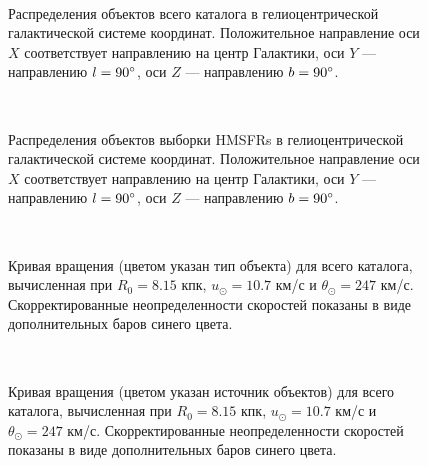 \documentclass[a4paper, oneside, 14pt]{article}
\begin{document}
\begin{figure}[p!]
  \centering
  \\
  \caption{Распределения объектов всего каталога в гелиоцентрической галактической системе координат. Положительное направление оси $ X $ соответствует направлению на центр Галактики, оси $ Y $ --- направлению $ l = 90\degree $, оси $ Z $ --- направлению $ b = 90\degree$.}
  \label{fig:all_xyz}
\end{figure}

\begin{figure}[p!]
  \centering
  \\
  \caption{Распределения объектов выборки HMSFRs в гелиоцентрической галактической системе координат. Положительное направление оси $ X $ соответствует направлению на центр Галактики, оси $ Y $ --- направлению $ l = 90\degree $, оси $ Z $ --- направлению $ b = 90\degree$.}
  \label{fig:hmsfrs_xyz}
\end{figure}

\begin{figure}[p!]
  \centering
  \\
  \caption{Кривая вращения (цветом указан тип объекта) для всего каталога, вычисленная при $ R_0 = 8.15 $ кпк, $ u_\odot = 10.7 $ км/с и $ \theta_\odot = 247 $ км/с. Скорректированные неопределенности скоростей показаны в виде дополнительных баров синего цвета.}
  \label{fig:all_rotation_curves}
\end{figure}

\begin{figure}[p!]
  \centering
  \\
  \caption{Кривая вращения (цветом указан источник объектов) для всего каталога, вычисленная при $ R_0 = 8.15 $ кпк, $ u_\odot = 10.7 $ км/с и $ \theta_\odot = 247 $ км/с. Скорректированные неопределенности скоростей показаны в виде дополнительных баров синего цвета.}
  \label{fig:hmsfrs_rotation_curves}
\end{figure}
\end{document}
